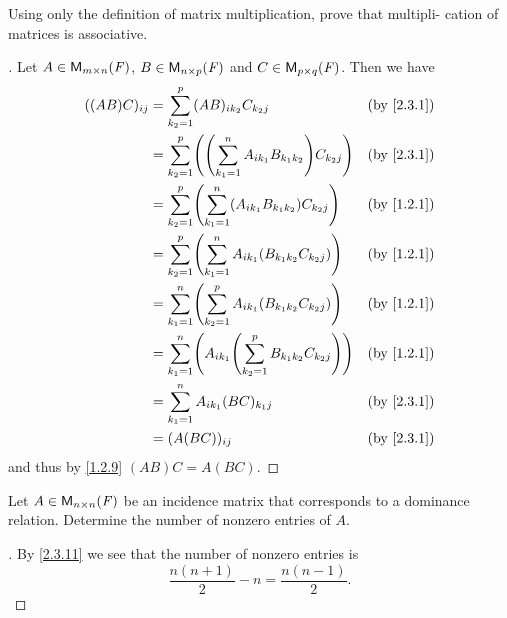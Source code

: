 \begin{ex}\label{ex:2.3.18}
  Using only the definition of matrix multiplication, prove that multipli- cation of matrices is associative.
\end{ex}

\begin{proof}[]
  Let \(A \in \mathsf{M}_{{m} \times n}({\mathit{F}})\), \(B \in \mathsf{M}_{{n} \times p}({\mathit{F}})\) and \(C \in \mathsf{M}_{{p} \times q}({\mathit{F}})\).
  Then we have
  \begin{align*}
    ((AB) C)_{i j} & = \sum_{k_2 = 1}^p (AB)_{i k_2} C_{k_2 j}                                     &  & \text{(by \cref{2.3.1})} \\
                   & = \sum_{k_2 = 1}^p \pa{\pa{\sum_{k_1 = 1}^n A_{i k_1} B_{k_1 k_2}} C_{k_2 j}} &  & \text{(by \cref{2.3.1})} \\
                   & = \sum_{k_2 = 1}^p \pa{\sum_{k_1 = 1}^n (A_{i k_1} B_{k_1 k_2}) C_{k_2 j}}    &  & \text{(by \cref{1.2.1})} \\
                   & = \sum_{k_2 = 1}^p \pa{\sum_{k_1 = 1}^n A_{i k_1} (B_{k_1 k_2} C_{k_2 j})}    &  & \text{(by \cref{1.2.1})} \\
                   & = \sum_{k_1 = 1}^n \pa{\sum_{k_2 = 1}^p A_{i k_1} (B_{k_1 k_2} C_{k_2 j})}    &  & \text{(by \cref{1.2.1})} \\
                   & = \sum_{k_1 = 1}^n \pa{A_{i k_1} \pa{\sum_{k_2 = 1}^p B_{k_1 k_2} C_{k_2 j}}} &  & \text{(by \cref{1.2.1})} \\
                   & = \sum_{k_1 = 1}^n A_{i k_1} (BC)_{k_1 j}                                     &  & \text{(by \cref{2.3.1})} \\
                   & = (A (BC))_{i j}                                                              &  & \text{(by \cref{2.3.1})}
  \end{align*}
  and thus by \cref{1.2.9} \((AB) C = A (BC)\).
\end{proof}

\setcounter{ex}{22}
\begin{ex}\label{ex:2.3.23}
  Let \(A \in \mathsf{M}_{{n} \times n}({\mathit{F}})\) be an incidence matrix that corresponds to a dominance relation.
  Determine the number of nonzero entries of \(A\).
\end{ex}

\begin{proof}[]
  By \cref{2.3.11} we see that the number of nonzero entries is
  \[
    \frac{n (n + 1)}{2} - n = \frac{n (n - 1)}{2}.
  \]
\end{proof}
